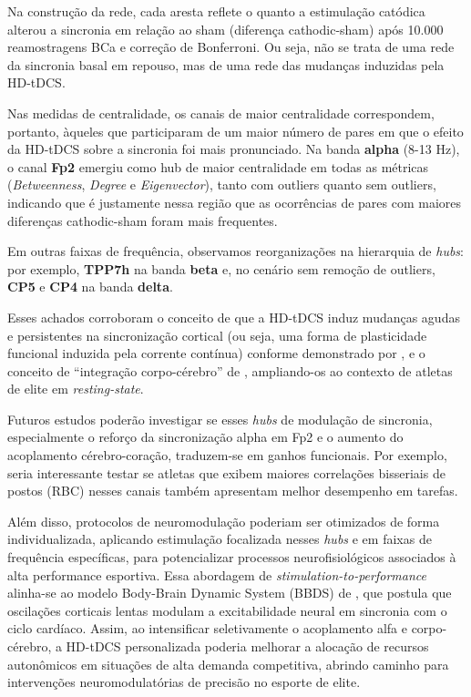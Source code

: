 Na construção da rede, cada aresta reflete o quanto a estimulação catódica alterou a sincronia em relação ao sham (diferença cathodic-sham) após 10.000 reamostragens BCa e correção de Bonferroni. Ou seja, não se trata de uma rede da sincronia basal em repouso, mas de uma rede das mudanças induzidas pela HD-tDCS.

Nas medidas de centralidade, os canais de maior centralidade correspondem, portanto, àqueles que participaram de um maior número de pares em que o efeito da HD-tDCS sobre a sincronia foi mais pronunciado. Na banda \textbf{alpha} (8-13 Hz), o canal \textbf{Fp2} emergiu como hub de maior centralidade em todas as métricas (\textit{Betweenness}, \textit{Degree} e \textit{Eigenvector}), tanto com outliers quanto sem outliers, indicando que é justamente nessa região que as ocorrências de pares com maiores diferenças cathodic-sham foram mais frequentes.

Em outras faixas de frequência, observamos reorganizações na hierarquia de \textit{hubs}: por exemplo, \textbf{TPP7h} na banda \textbf{beta} e, no cenário sem remoção de outliers, \textbf{CP5} e \textbf{CP4} na banda \textbf{delta}.

Esses achados corroboram o conceito de que a HD-tDCS induz mudanças agudas e persistentes na sincronização cortical (ou seja, uma forma de plasticidade funcional induzida pela corrente contínua) conforme demonstrado por , e o conceito de ``integração corpo-cérebro'' de , ampliando-os ao contexto de atletas de elite em \emph{resting-state}.

Futuros estudos poderão investigar se esses \emph{hubs} de modulação de sincronia, especialmente o reforço da sincronização alpha em Fp2 e o aumento do acoplamento cérebro-coração, traduzem-se em ganhos funcionais. Por exemplo, seria interessante testar se atletas que exibem maiores correlações bisseriais de postos (RBC) nesses canais também apresentam melhor desempenho em tarefas.

Além disso, protocolos de neuromodulação poderiam ser otimizados de forma individualizada, aplicando estimulação focalizada nesses \textit{hubs} e em faixas de frequência específicas, para potencializar processos neurofisiológicos associados à alta performance esportiva. Essa abordagem de \textit{stimulation-to-performance} alinha-se ao modelo Body-Brain Dynamic System (BBDS) de , que postula que oscilações corticais lentas modulam a excitabilidade neural em sincronia com o ciclo cardíaco. Assim, ao intensificar seletivamente o acoplamento alfa e corpo-cérebro, a HD-tDCS personalizada poderia melhorar a alocação de recursos autonômicos em situações de alta demanda competitiva, abrindo caminho para intervenções neuromodulatórias de precisão no esporte de elite.

